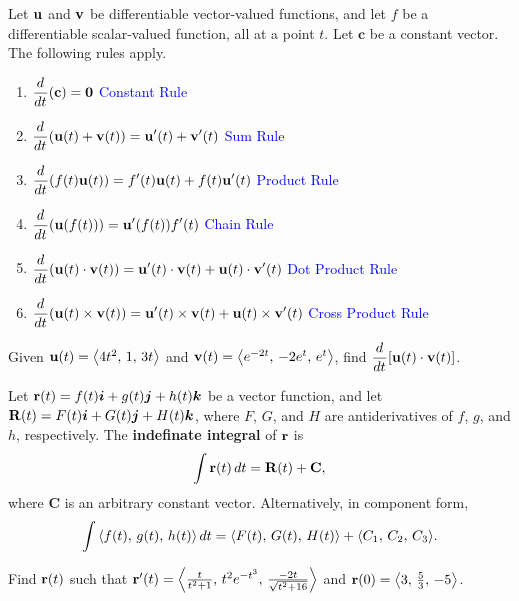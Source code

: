 \documentclass[mathNotesPreamble]{subfiles}
\begin{document}
  \begin{thmBox*}
    Let ${\mathbf{u}}$ and ${\mathbf{v}}$ be differentiable vector-valued functions, and let $f$ be a differentiable scalar-valued function, all at a point $t$. Let $\mathbf c$ be a constant vector. The following rules apply.
    \begin{enumerate}
      \item $\displaystyle {\frac{d^{}}{dt^{}}}(\mathbf c)=\mathbf{0}$ \tab \textcolor{blue}{Constant Rule}
      \item $\displaystyle {\frac{d^{}}{dt^{}}}{\left({\mathbf{u}}(t)+{\mathbf{v}}(t)\right)}={\mathbf{u}}'(t)+{\mathbf{v}}'(t)$ \tab \textcolor{blue}{Sum Rule}
      \item $\displaystyle {\frac{d^{}}{dt^{}}}{\left(f(t){\mathbf{u}}(t)\right)}=f'(t){\mathbf{u}}(t)+f(t){\mathbf{u}}'(t)$ \tab \textcolor{blue}{Product Rule}
      \item $\displaystyle {\frac{d^{}}{dt^{}}}{\left({\mathbf{u}}(f(t))\right)}={\mathbf{u}}'{\left(f(t)\right)}f'(t)$ \tab \textcolor{blue}{Chain Rule}
      \item $\displaystyle {\frac{d^{}}{dt^{}}}{\left({\mathbf{u}}(t)\cdot{\mathbf{v}}(t)\right)}={\mathbf{u}}'(t)\cdot{\mathbf{v}}(t)+{\mathbf{u}}(t)\cdot{\mathbf{v}}'(t)$ \tab \textcolor{blue}{Dot Product Rule}
      \item $\displaystyle {\frac{d^{}}{dt^{}}}{\left({\mathbf{u}}(t)\times{\mathbf{v}}(t)\right)}={\mathbf{u}}'(t)\times{\mathbf{v}}(t)+{\mathbf{u}}(t)\times{\mathbf{v}}'(t)$ \tab \textcolor{blue}{Cross Product Rule}
    \end{enumerate}
  \end{thmBox*}
  \begin{ex*}
    Given ${\mathbf{u}}(t)={\left\langle 4t^2,\,1,\,3t \right\rangle}$ and ${\mathbf{v}}(t)={\left\langle e^{-2t},\,-2e^t,\,e^t \right\rangle}$, find $\displaystyle {\frac{d^{}}{dt^{}}}{\left[{\mathbf{u}}(t)\cdot{\mathbf{v}}(t)\right]}$.
  \end{ex*}
  \pagebreak
  
  \begin{defn*}
    Let ${\mathbf{r}}(t)=f(t) {\bm{i}}+g(t) {\bm{j}}+h(t) {\bm{k}}$ be a vector function, and let \newline $\mathbf R(t)=F(t) {\bm{i}}+G(t) {\bm{j}}+H(t) {\bm{k}}$, where $F$, $G$, and $H$ are antiderivatives of $f$, $g$, and $h$, respectively. The \textbf{indefinate integral} of ${\mathbf{r}}$ is
      \[\int{\mathbf{r}}(t)\,dt=\mathbf R(t)+\mathbf C,\]
    where $\mathbf C$ is an arbitrary constant vector. Alternatively, in component form,
      \[\int{\left\langle f(t),\,g(t),\,h(t) \right\rangle}\,dt={\left\langle F(t),\,G(t),\,H(t) \right\rangle}+{\left\langle C_1,\,C_2,\,C_3 \right\rangle}.\]
  \end{defn*}
  \begin{ex*}
    Find ${\mathbf{r}}(t)$ such that ${\mathbf{r}}'(t)={\left\langle \frac{t}{t^2+1},\,t^2e^{-t^3},\,\frac{-2t}{\sqrt{t^2+16}} \right\rangle}$ and ${\mathbf{r}}(0)={\left\langle 3,\,\frac{5}{3},\,-5 \right\rangle}$.
  \end{ex*}
  \pagebreak
\end{document}
